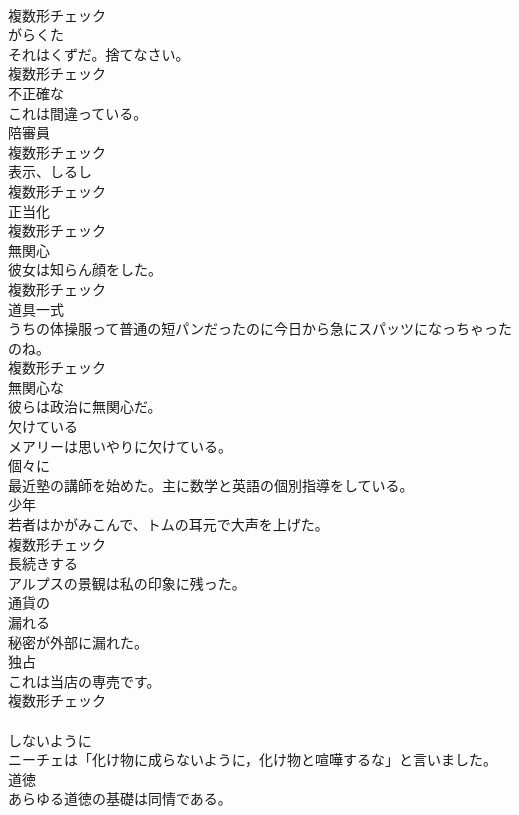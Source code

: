 \documentclass[8pt]{extreport}
\begin{document}
\begin{CJK}{UTF8}{min}
\\	複数形チェック
\\	[名詞]	がらくた	
\\	それはくずだ。捨てなさい。	
\\	複数形チェック
\\	[形容詞]	不正確な	
\\	これは間違っている。	
\\	[名詞]	陪審員	
\\	複数形チェック
\\	[名詞]	表示、しるし	
\\	複数形チェック
\\	[名詞]	正当化	
\\	複数形チェック
\\	[名詞]	無関心	
\\	彼女は知らん顔をした。	
\\	複数形チェック
\\	[名詞]	道具一式	
\\	うちの体操服って普通の短パンだったのに今日から急にスパッツになっちゃったのね。	
\\	複数形チェック
\\	[形容詞]	無関心な	
\\	彼らは政治に無関心だ。	
\\	[形容詞]	欠けている	
\\	メアリーは思いやりに欠けている。	
\\	[副詞]	個々に	
\\	最近塾の講師を始めた。主に数学と英語の個別指導をしている。	
\\	[名詞]	少年	
\\	若者はかがみこんで、トムの耳元で大声を上げた。	
\\	複数形チェック
\\	[形容詞]	⻑続きする	
\\	アルプスの景観は私の印象に残った。	
\\	[形容詞]	通貨の	
\\	[動詞]	漏れる	
\\	秘密が外部に漏れた。	
\\	[名詞]	独占	
\\	これは当店の専売です。	
\\	複数形チェック
\\	[接続詞]	
\\	しないように	
\\	ニーチェは「化け物に成らないように，化け物と喧嘩するな」と言いました。	
\\	[名詞]	道徳	
\\	あらゆる道徳の基礎は同情である。	

\end{CJK}
\end{document}
